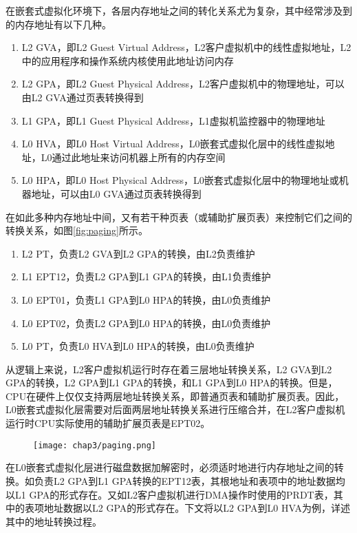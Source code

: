 在嵌套式虚拟化环境下，各层内存地址之间的转化关系尤为复杂，其中经常涉及到的内存地址有以下几种。

\begin{enumerate}
\item L2 GVA，即L2 Guest Virtual Address，L2客户虚拟机中的线性虚拟地址，L2中的应用程序和操作系统内核使用此地址访问内存
\item L2 GPA，即L2 Guest Physical Address，L2客户虚拟机中的物理地址，可以由L2 GVA通过页表转换得到
\item L1 GPA，即L1 Guest Physical Address，L1虚拟机监控器中的物理地址
\item L0 HVA，即L0 Host Virtual Address，L0嵌套式虚拟化层中的线性虚拟地址，L0通过此地址来访问机器上所有的内存空间
\item L0 HPA，即L0 Host Physical Address，L0嵌套式虚拟化层中的物理地址或机器地址，可以由L0 GVA通过页表转换得到
\end{enumerate}

在如此多种内存地址中间，又有若干种页表（或辅助扩展页表）来控制它们之间的转换关系，如图\ref{fig:paging}所示。

\begin{enumerate}
\item L2 PT，负责L2 GVA到L2 GPA的转换，由L2负责维护
\item L1 EPT12，负责L2 GPA到L1 GPA的转换，由L1负责维护
\item L0 EPT01，负责L1 GPA到L0 HPA的转换，由L0负责维护
\item L0 EPT02，负责L2 GPA到L0 HPA的转换，由L0负责维护
\item L0 PT，负责L0 HVA到L0 HPA的转换，由L0负责维护
\end{enumerate}

从逻辑上来说，L2客户虚拟机运行时存在着三层地址转换关系，L2 GVA到L2 GPA的转换，L2 GPA到L1 GPA的转换，和L1 GPA到L0 HPA的转换。但是，CPU在硬件上仅仅支持两层地址转换关系，即普通页表和辅助扩展页表。因此，L0嵌套式虚拟化层需要对后面两层地址转换关系进行压缩合并，在L2客户虚拟机运行时CPU实际使用的辅助扩展页表是EPT02。

\begin{figure}[!htbp]
  \centering
  \texttt{[image: chap3/paging.png]}
\end{figure}

在L0嵌套式虚拟化层进行磁盘数据加解密时，必须适时地进行内存地址之间的转换。如负责L2 GPA到L1 GPA转换的EPT12表，其根地址和表项中的地址数据均以L1 GPA的形式存在。又如L2客户虚拟机进行DMA操作时使用的PRDT表，其中的表项地址数据以L2 GPA的形式存在。下文将以L2 GPA到L0 HVA为例，详述其中的地址转换过程。

